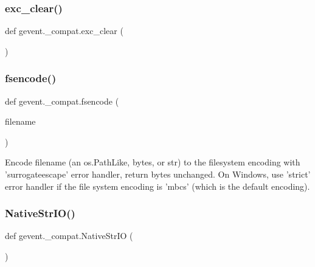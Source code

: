 \subsubsection{\texorpdfstring{exc\+\_\+clear()}{exc\_clear()}}
{\footnotesize\ttfamily def gevent.\+\_\+compat.\+exc\+\_\+clear (\begin{DoxyParamCaption}{ }\end{DoxyParamCaption})}

\mbox{\label{namespacegevent_1_1__compat_a01664232f6552b9c39c515aed5b9a2a9}} 
\subsubsection{\texorpdfstring{fsencode()}{fsencode()}}
{\footnotesize\ttfamily def gevent.\+\_\+compat.\+fsencode (\begin{DoxyParamCaption}\item[{}]{filename }\end{DoxyParamCaption})}

\begin{DoxyVerb}Encode filename (an os.PathLike, bytes, or str) to the filesystem
encoding with 'surrogateescape' error handler, return bytes unchanged.
On Windows, use 'strict' error handler if the file system encoding is
'mbcs' (which is the default encoding).
\end{DoxyVerb}
 \mbox{\label{namespacegevent_1_1__compat_a4a0e1b8df67d60b99bd9cc9a3cf71de5}} 
\subsubsection{\texorpdfstring{Native\+Str\+I\+O()}{NativeStrIO()}}
{\footnotesize\ttfamily def gevent.\+\_\+compat.\+Native\+Str\+IO (\begin{DoxyParamCaption}{ }\end{DoxyParamCaption})}

\mbox{\label{namespacegevent_1_1__compat_a07063d0a567e55c2e6081fe27aea1daf}} 
